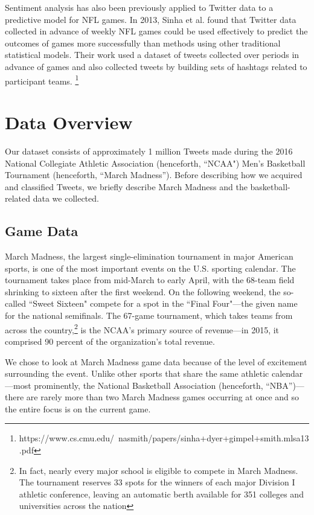 \documentclass[12pt]{article}
\begin{document}
\begin{doublespacing}
Sentiment analysis has also been previously applied
to Twitter data to a predictive model for NFL games. 
In 2013, Sinha et al. found that Twitter data collected
in advance of weekly NFL games could be used effectively
to predict the outcomes of games more successfully than
methods using other traditional statistical models. Their
work used a dataset of tweets collected over periods 
in advance of games and also collected tweets by 
building sets of hashtags related to participant teams.
\footnote{https://www.cs.cmu.edu/~nasmith/papers/sinha+dyer+gimpel+smith.mlsa13.pdf}

\section{Data Overview}

Our dataset consists of approximately 1 million Tweets made during the 2016 National Collegiate Athletic Association (henceforth, ``NCAA") Men's Basketball Tournament (henceforth, ``March Madness''). Before describing how we acquired and classified Tweets, we briefly describe March Madness and the basketball-related data we collected. 

\subsection{Game Data}

March Madness, the largest single-elimination tournament in major American sports, is one of the most important events on the U.S. sporting calendar. The tournament takes place from mid-March to early April, with the 68-team field shrinking to sixteen after the first weekend. On the following weekend, the so-called ``Sweet Sixteen" compete for a spot in the ``Final Four"---the given name for the national semifinals. The 67-game tournament, which takes teams from across the country,\footnote{In fact, nearly every major school is eligible to compete in March Madness. The tournament reserves 33 spots for the winners of each major Division I athletic conference, leaving an automatic berth available for 351 colleges and universities across the nation} is the NCAA's primary source of revenue---in 2015, it comprised 90 percent of the organization's total revenue. 

We chose to look at March Madness game data because of the level of excitement surrounding the event. Unlike other sports that share the same athletic calendar---most prominently, the National Basketball Association (henceforth, ``NBA'')---there are rarely more than two March Madness games occurring at once and so the entire focus is on the current game. 


\end{doublespacing}
\end{document}
